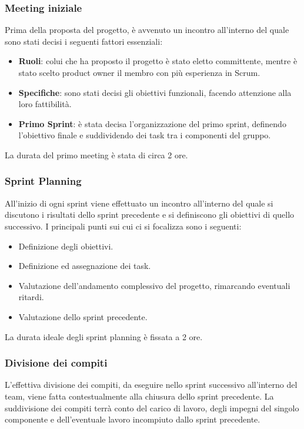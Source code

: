 \subsubsection{Meeting iniziale}
Prima della proposta del progetto, è avvenuto un incontro all'interno del quale sono stati decisi i seguenti fattori essenziali:
\begin{itemize}
    \item \textbf{Ruoli}: colui che ha proposto il progetto è stato eletto committente, mentre è stato scelto product owner il membro con più esperienza in Scrum.
    \item \textbf{Specifiche}: sono stati decisi gli obiettivi funzionali, facendo attenzione alla loro fattibilità.
    \item \textbf{Primo Sprint}: è stata decisa l'organizzazione del primo sprint, definendo l'obiettivo finale e suddividendo dei task tra i componenti del gruppo.
\end{itemize}
La durata del primo meeting è stata di circa 2 ore.

\subsubsection{Sprint Planning}
All'inizio di ogni sprint viene effettuato un incontro all'interno del quale si discutono i
risultati dello sprint precedente e si definiscono gli obiettivi di quello successivo.
I principali punti sui cui ci si focalizza sono i seguenti:
\begin{itemize}
    \item Definizione degli obiettivi.
    \item Definizione ed assegnazione dei task.
    \item Valutazione dell'andamento complessivo del progetto, rimarcando eventuali ritardi.
    \item Valutazione dello sprint precedente.
\end{itemize}

La durata ideale degli sprint planning è fissata a 2 ore.

\subsubsection{Divisione dei compiti}
L'effettiva divisione dei compiti, da eseguire nello sprint successivo all'interno del team, viene fatta
contestualmente alla chiusura dello sprint precedente. La suddivisione dei compiti terrà conto del carico di lavoro, degli
impegni del singolo componente e dell'eventuale lavoro incompiuto dallo sprint precedente.

